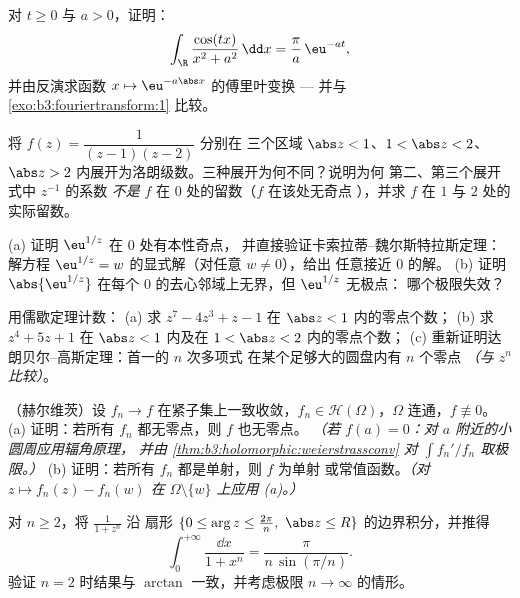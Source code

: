 \begin{exercise}[$\star\star$]\label{exo:b3:residues:4}
对 $t \geq 0$ 与 $a > 0$，证明：
\[
\int_\R\frac{\cos(tx)}{x^2 + a^2}\,\dd x =
\frac{\pi}{a}\,\eu^{-at},
\]
并由反演求函数 $x \mapsto \eu^{-a\abs
x}$ 的傅里叶变换 --- 并与
\cref{exo:b3:fouriertransform:1} 比较。
\end{exercise}

\begin{exercise}[$\star\star$]\label{exo:b3:residues:5}
将 $f(z) = \dfrac1{(z-1)(z-2)}$ 分别在
三个区域 $\abs z < 1$、$1 < \abs z < 2$、$\abs z >
2$ 内展开为洛朗级数。三种展开为何不同？说明为何
第二、第三个展开式中 $z^{-1}$ 的系数
\emph{不是} $f$ 在 $0$ 处的留数（$f$ 在该处无奇点
），并求 $f$ 在 $1$ 与
$2$ 处的实际留数。
\end{exercise}

\begin{exercise}[$\star\star$]\label{exo:b3:residues:6}
(a) 证明 $\eu^{1/z}$ 在 $0$ 处有本性奇点，
并直接验证卡索拉蒂--魏尔斯特拉斯定理：解方程 $\eu^{1/z} =
w$ 的显式解（对任意 $w \neq 0$），给出
任意接近 $0$ 的解。
(b) 证明 $\abs{\eu^{1/z}}$ 在每个
$0$ 的去心邻域上无界，但 $\eu^{1/z}$ 无极点：
哪个极限失效？
\end{exercise}

\begin{exercise}[$\star\star$]\label{exo:b3:residues:7}
用儒歇定理计数：
(a) 求 $z^7 - 4z^3 + z - 1$ 在 $\abs z < 1$ 内的零点个数；
(b) 求 $z^4 + 5z + 1$ 在 $\abs z < 1$ 内及在 $1 <
\abs z < 2$ 内的零点个数；
(c) 重新证明达朗贝尔–高斯定理：首一的 $n$ 次多项式
在某个足够大的圆盘内有 $n$ 个零点 \emph{（与
$z^n$ 比较）}。
\end{exercise}

\begin{exercise}[$\star\star\star$]\label{exo:b3:residues:8}
（赫尔维茨）设 $f_n \to f$ 在紧子集上一致收敛，$f_n \in
\mathcal H(\Omega)$，$\Omega$ 连通，$f \not\equiv 0$。
(a) 证明：若所有 $f_n$ 都无零点，则 $f$ 也无零点。
\emph{（若 $f(a) = 0$：对 $a$ 附近的小圆周应用辐角原理，
并由 \cref{thm:b3:holomorphic:weierstrassconv} 对
$\int f_n'/f_n$ 取极限。）}
(b) 证明：若所有 $f_n$ 都是单射，则 $f$ 为单射
或常值函数。\emph{（对 $z \mapsto f_n(z) - f_n(w)$ 在
$\Omega\setminus\{w\}$ 上应用 (a)。）}
\end{exercise}

\begin{exercise}[$\star\star\star$]\label{exo:b3:residues:9}
对 $n \geq 2$，将 $\frac1{1 + z^n}$ 沿
扇形 $\{0 \leq \arg z \leq \frac{2\pi}n,\ \abs z
\leq R\}$ 的边界积分，并推得
\[
\int_0^{+\infty}\frac{\dd x}{1 + x^n} =
\frac{\pi}{n\,\sin(\pi/n)} .
\]
验证 $n = 2$ 时结果与 $\arctan$ 一致，并考虑极限 $n \to
\infty$ 的情形。
\end{exercise}

